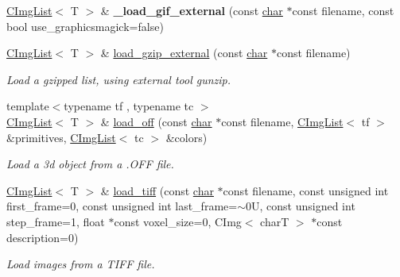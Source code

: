 \begin{DoxyCompactItemize}
\mbox{\label{structcimg__library__suffixed_1_1CImgList_a666592ad2e1ecef3317d060696ebbfaa}} 
\hyperlink{structcimg__library__suffixed_1_1CImgList}{C\+Img\+List}$<$ T $>$ \& {\bfseries \+\_\+load\+\_\+gif\+\_\+external} (const \hyperlink{classchar}{char} $\ast$const filename, const bool use\+\_\+graphicsmagick=false)
\item 
\hyperlink{structcimg__library__suffixed_1_1CImgList}{C\+Img\+List}$<$ T $>$ \& \hyperlink{structcimg__library__suffixed_1_1CImgList_aae55e9a79bf2f7e08108dd200f63bf2c}{load\+\_\+gzip\+\_\+external} (const \hyperlink{classchar}{char} $\ast$const filename)
\begin{DoxyCompactList}\small\item\em Load a gzipped list, using external tool \textquotesingle{}gunzip\textquotesingle{}. \end{DoxyCompactList}\item 
{\footnotesize template$<$typename tf , typename tc $>$ }\\\hyperlink{structcimg__library__suffixed_1_1CImgList}{C\+Img\+List}$<$ T $>$ \& \hyperlink{structcimg__library__suffixed_1_1CImgList_a01772b523fe250d7d1f11e2e7eda0456}{load\+\_\+off} (const \hyperlink{classchar}{char} $\ast$const filename, \hyperlink{structcimg__library__suffixed_1_1CImgList}{C\+Img\+List}$<$ tf $>$ \&primitives, \hyperlink{structcimg__library__suffixed_1_1CImgList}{C\+Img\+List}$<$ tc $>$ \&colors)
\begin{DoxyCompactList}\small\item\em Load a 3d object from a .O\+FF file. \end{DoxyCompactList}\item 
\hyperlink{structcimg__library__suffixed_1_1CImgList}{C\+Img\+List}$<$ T $>$ \& \hyperlink{structcimg__library__suffixed_1_1CImgList_a2ee1347a41996201ec7dcfcc9b403bdc}{load\+\_\+tiff} (const \hyperlink{classchar}{char} $\ast$const filename, const unsigned int first\+\_\+frame=0, const unsigned int last\+\_\+frame=$\sim$0\+U, const unsigned int step\+\_\+frame=1, float $\ast$const voxel\+\_\+size=0, C\+Img$<$ char\+T $>$ $\ast$const description=0)
\begin{DoxyCompactList}\small\item\em Load images from a T\+I\+FF file. \end{DoxyCompactList}\item 
\mbox{\label{structcimg__library__suffixed_1_1CImgList_aa6103709b1dee0aec2a199650a1c0c5d}} 

\end{DoxyCompactItemize}
